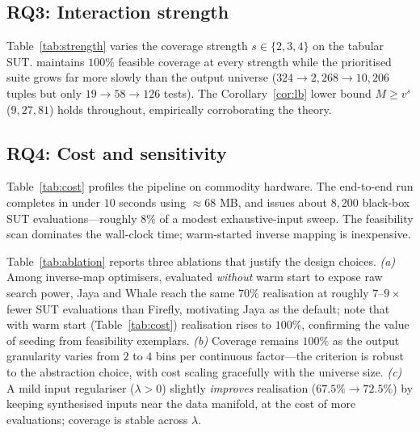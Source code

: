 \begin{table}[t]
\centering
\caption{Multi-domain generality (per domain: \rnwise{} vs.\ matched-budget
random).}
\label{tab:multidomain}

\end{table}

\subsection{RQ3: Interaction strength}
Table~\ref{tab:strength} varies the coverage strength $s\in\{2,3,4\}$ on the
tabular SUT. \rnwise{} maintains $100\%$ feasible coverage at every strength while
the prioritised suite grows far more slowly than the output universe
($324\to2{,}268\to10{,}206$ tuples but only $19\to58\to126$ tests). The
Corollary~\ref{cor:lb} lower bound $M\ge v^{s}$ ($9,27,81$) holds throughout,
empirically corroborating the theory.

\begin{table}[t]
\centering
\caption{Strength scaling on UCI Adult + XGBoost. The $M\ge v^{s}$ bound
(Corollary~\ref{cor:lb}) holds at every strength.}
\label{tab:strength}

\end{table}

\subsection{RQ4: Cost and sensitivity}
Table~\ref{tab:cost} profiles the pipeline on commodity hardware. The end-to-end
run completes in under $10$ seconds using $\approx 68$ MB, and issues about
$8{,}200$ black-box SUT evaluations---roughly $8\%$ of a modest exhaustive-input
sweep. The feasibility scan dominates the wall-clock time; warm-started inverse
mapping is inexpensive.

\begin{table}[t]
\centering
\caption{Cost profile of the \rnwise{} pipeline (UCI Adult + XGBoost).}
\label{tab:cost}

\end{table}

Table~\ref{tab:ablation} reports three ablations that justify the design
choices. \emph{(a)} Among inverse-map optimisers, evaluated \emph{without} warm
start to expose raw search power, Jaya and Whale reach the same $70\%$ realisation
at roughly $7$--$9\times$ fewer SUT evaluations than Firefly, motivating Jaya as
the default; note that with warm start (Table~\ref{tab:cost}) realisation rises to
$100\%$, confirming the value of seeding from feasibility exemplars.
\emph{(b)} Coverage remains $100\%$ as the output granularity varies from $2$ to
$4$ bins per continuous factor---the criterion is robust to the abstraction
choice, with cost scaling gracefully with the universe size. \emph{(c)} A mild
input regulariser ($\lambda>0$) slightly \emph{improves} realisation
($67.5\%\to72.5\%$) by keeping synthesised inputs near the data manifold, at the
cost of more evaluations; coverage is stable across $\lambda$.

\begin{table}[t]
\centering
\caption{Ablations on UCI Adult + XGBoost: inverse-map optimiser, output
granularity, and regulariser weight.}
\label{tab:ablation}

\end{table}

